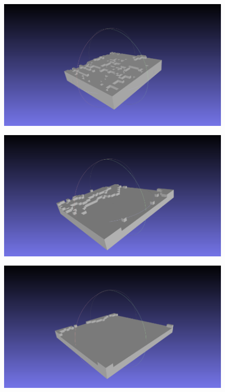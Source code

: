 \begin{figure}[htbp]
    \centering
    \begin{minipage}[b]{0.49\linewidth}
      \centering
      \includegraphics[keepaspectratio, scale=0.45]{images/voxel1.png}
      \label{fig:voxel1}
    \end{minipage}
    \begin{minipage}[b]{0.49\linewidth}
      \centering
      \includegraphics[keepaspectratio, scale=0.45]{images/voxel2.png}
      \label{fig:voxel2}
    \end{minipage}
    \begin{minipage}[b]{0.49\linewidth}
      \centering
      \includegraphics[keepaspectratio, scale=0.45]{images/voxel3.png}

\end{minipage}
\end{figure}
